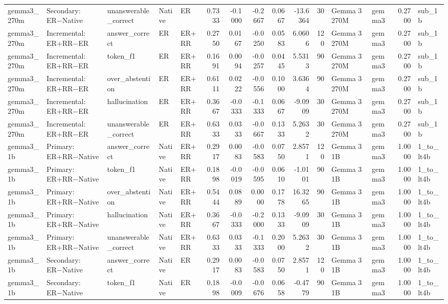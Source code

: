 \begin{tabular}{lllllrrrrrrllrl}
gemma3_270m & Secondary: ER−Native & unanswerable_correct & Native & ER & 0.7333 & -0.1000 & -0.2667 & 0.0667 & -13.6364 & 30 & Gemma 3 270M & gemma3 & 0.2700 & sub_1b \\
gemma3_270m & Incremental: ER+RR−ER & answer_correct & ER & ER+RR & 0.2750 & 0.0167 & -0.0250 & 0.0583 & 6.0606 & 120 & Gemma 3 270M & gemma3 & 0.2700 & sub_1b \\
gemma3_270m & Incremental: ER+RR−ER & token_f1 & ER & ER+RR & 0.1691 & 0.0094 & -0.0257 & 0.0445 & 5.5313 & 90 & Gemma 3 270M & gemma3 & 0.2700 & sub_1b \\
gemma3_270m & Incremental: ER+RR−ER & over_abstention & ER & ER+RR & 0.6111 & 0.0222 & -0.0556 & 0.1000 & 3.6364 & 90 & Gemma 3 270M & gemma3 & 0.2700 & sub_1b \\
gemma3_270m & Incremental: ER+RR−ER & hallucination & ER & ER+RR & 0.3667 & -0.0333 & -0.1333 & 0.0667 & -9.0909 & 30 & Gemma 3 270M & gemma3 & 0.2700 & sub_1b \\
gemma3_270m & Incremental: ER+RR−ER & unanswerable_correct & ER & ER+RR & 0.6333 & 0.0333 & -0.0667 & 0.1333 & 5.2632 & 30 & Gemma 3 270M & gemma3 & 0.2700 & sub_1b \\
gemma3_1b & Primary: ER+RR−Native & answer_correct & Native & ER+RR & 0.2917 & 0.0083 & -0.0583 & 0.0750 & 2.8571 & 120 & Gemma 3 1B & gemma3 & 1.0000 & 1_to_lt4b \\
gemma3_1b & Primary: ER+RR−Native & token_f1 & Native & ER+RR & 0.1898 & -0.0019 & -0.0595 & 0.0610 & -1.0101 & 90 & Gemma 3 1B & gemma3 & 1.0000 & 1_to_lt4b \\
gemma3_1b & Primary: ER+RR−Native & over_abstention & Native & ER+RR & 0.5444 & 0.0889 & 0.0000 & 0.1778 & 16.3265 & 90 & Gemma 3 1B & gemma3 & 1.0000 & 1_to_lt4b \\
gemma3_1b & Primary: ER+RR−Native & hallucination & Native & ER+RR & 0.3667 & -0.0333 & -0.2000 & 0.1333 & -9.0909 & 30 & Gemma 3 1B & gemma3 & 1.0000 & 1_to_lt4b \\
gemma3_1b & Primary: ER+RR−Native & unanswerable_correct & Native & ER+RR & 0.6333 & 0.0333 & -0.1333 & 0.2000 & 5.2632 & 30 & Gemma 3 1B & gemma3 & 1.0000 & 1_to_lt4b \\
gemma3_1b & Secondary: ER−Native & answer_correct & Native & ER & 0.2917 & 0.0083 & -0.0583 & 0.0750 & 2.8571 & 120 & Gemma 3 1B & gemma3 & 1.0000 & 1_to_lt4b \\
gemma3_1b & Secondary: ER−Native & token_f1 & Native & ER & 0.1898 & -0.0009 & -0.0676 & 0.0658 & -0.4779 & 90 & Gemma 3 1B & gemma3 & 1.0000 & 1_to_lt4b \\

\end{tabular}
